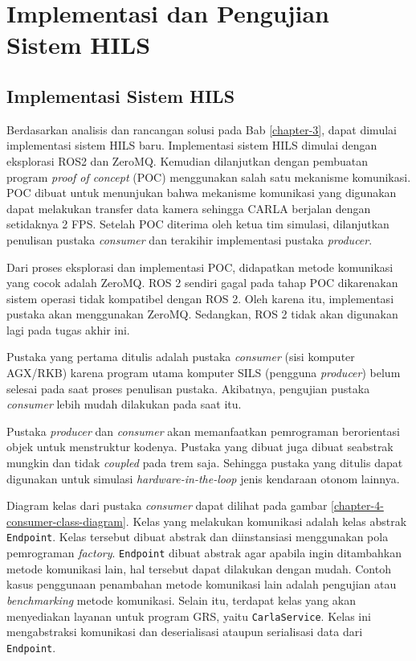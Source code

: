 \chapter{Implementasi dan Pengujian Sistem HILS}\label{chapter-4}

\section{Implementasi Sistem HILS}

Berdasarkan analisis dan rancangan solusi pada Bab \ref{chapter-3}, dapat
dimulai implementasi sistem HILS baru. Implementasi sistem HILS dimulai dengan
eksplorasi ROS2 dan ZeroMQ. Kemudian dilanjutkan dengan pembuatan program
\textit{proof of concept} (POC) menggunakan salah satu mekanisme komunikasi.
POC dibuat untuk menunjukan bahwa mekanisme komunikasi yang digunakan dapat
melakukan transfer data kamera sehingga CARLA berjalan dengan setidaknya 2 FPS.
Setelah POC diterima oleh ketua tim simulasi, dilanjutkan penulisan pustaka
\textit{consumer} dan terakihir implementasi pustaka \textit{producer}.

Dari proses eksplorasi dan implementasi POC, didapatkan metode komunikasi yang
cocok adalah ZeroMQ. ROS 2 sendiri gagal pada tahap POC dikarenakan sistem
operasi tidak kompatibel dengan ROS 2. Oleh karena itu, implementasi pustaka
akan menggunakan ZeroMQ. Sedangkan, ROS 2 tidak akan digunakan lagi pada tugas
akhir ini.

Pustaka yang pertama ditulis adalah pustaka \textit{consumer} (sisi
komputer AGX/RKB) karena program utama komputer SILS (pengguna
\textit{producer}) belum selesai pada saat proses penulisan pustaka. Akibatnya,
pengujian pustaka \textit{consumer} lebih mudah dilakukan pada saat itu.

Pustaka \textit{producer} dan \textit{consumer} akan memanfaatkan pemrograman
berorientasi objek untuk menstruktur kodenya. Pustaka yang dibuat juga dibuat
seabstrak mungkin dan tidak \textit{coupled} pada trem saja. Sehingga pustaka
yang ditulis dapat digunakan untuk simulasi \textit{hardware-in-the-loop} jenis
kendaraan otonom lainnya.

Diagram kelas dari pustaka \textit{consumer} dapat dilihat pada gambar
\ref{chapter-4-consumer-class-diagram}. Kelas yang melakukan komunikasi adalah
kelas abstrak \texttt{Endpoint}. Kelas tersebut dibuat abstrak dan diinstansiasi
menggunakan pola pemrograman \textit{factory}. \texttt{Endpoint} dibuat abstrak
agar apabila ingin ditambahkan metode komunikasi lain, hal tersebut dapat
dilakukan dengan mudah. Contoh kasus penggunaan penambahan metode komunikasi
lain adalah pengujian atau \textit{benchmarking} metode komunikasi. Selain itu,
terdapat kelas yang akan menyediakan layanan untuk program GRS, yaitu
\texttt{CarlaService}. Kelas ini mengabstraksi komunikasi dan deserialisasi
ataupun serialisasi data dari \texttt{Endpoint}.

